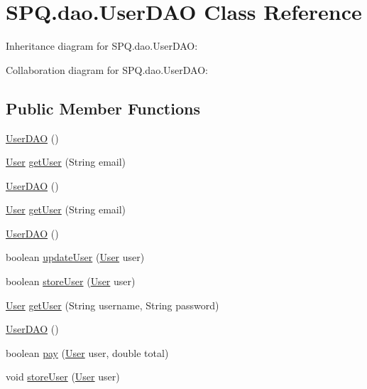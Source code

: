 \hypertarget{class_s_p_q_1_1dao_1_1_user_d_a_o}{}\section{S\+P\+Q.\+dao.\+User\+D\+AO Class Reference}
\label{class_s_p_q_1_1dao_1_1_user_d_a_o}


Inheritance diagram for S\+P\+Q.\+dao.\+User\+D\+AO\+:


Collaboration diagram for S\+P\+Q.\+dao.\+User\+D\+AO\+:
\subsection*{Public Member Functions}
\begin{DoxyCompactItemize}
\item 
\mbox{\hyperlink{class_s_p_q_1_1dao_1_1_user_d_a_o_ae1c3b0aaf2795cc7d4afec61cce3ec02}{User\+D\+AO}} ()
\item 
\mbox{\hyperlink{class_s_p_q_1_1data_1_1_user}{User}} \mbox{\hyperlink{class_s_p_q_1_1dao_1_1_user_d_a_o_aeb3901e9e260ad977a1b412fe7a9fc0e}{get\+User}} (String email)
\item 
\mbox{\hyperlink{class_s_p_q_1_1dao_1_1_user_d_a_o_ae1c3b0aaf2795cc7d4afec61cce3ec02}{User\+D\+AO}} ()
\item 
\mbox{\hyperlink{class_s_p_q_1_1data_1_1_user}{User}} \mbox{\hyperlink{class_s_p_q_1_1dao_1_1_user_d_a_o_aeb3901e9e260ad977a1b412fe7a9fc0e}{get\+User}} (String email)
\item 
\mbox{\hyperlink{class_s_p_q_1_1dao_1_1_user_d_a_o_ae1c3b0aaf2795cc7d4afec61cce3ec02}{User\+D\+AO}} ()
\item 
boolean \mbox{\hyperlink{class_s_p_q_1_1dao_1_1_user_d_a_o_a525b7db52aab94cfe24aeac14949504e}{update\+User}} (\mbox{\hyperlink{class_s_p_q_1_1data_1_1_user}{User}} user)
\item 
boolean \mbox{\hyperlink{class_s_p_q_1_1dao_1_1_user_d_a_o_ad86d4148c7f3fd960fb32de7c68f3f6a}{store\+User}} (\mbox{\hyperlink{class_s_p_q_1_1data_1_1_user}{User}} user)
\item 
\mbox{\hyperlink{class_s_p_q_1_1data_1_1_user}{User}} \mbox{\hyperlink{class_s_p_q_1_1dao_1_1_user_d_a_o_a2fe3e16e787f453b37f061de24cc49eb}{get\+User}} (String username, String password)
\item 
\mbox{\hyperlink{class_s_p_q_1_1dao_1_1_user_d_a_o_ae1c3b0aaf2795cc7d4afec61cce3ec02}{User\+D\+AO}} ()
\item 
boolean \mbox{\hyperlink{class_s_p_q_1_1dao_1_1_user_d_a_o_a8223c677b1ae55147860ea533be434a7}{pay}} (\mbox{\hyperlink{class_s_p_q_1_1data_1_1_user}{User}} user, double total)
\item 
void \mbox{\hyperlink{class_s_p_q_1_1dao_1_1_user_d_a_o_a9cc4105782c52054e71fa4938b55f7aa}{store\+User}} (\mbox{\hyperlink{class_s_p_q_1_1data_1_1_user}{User}} user)
\end{DoxyCompactItemize}
